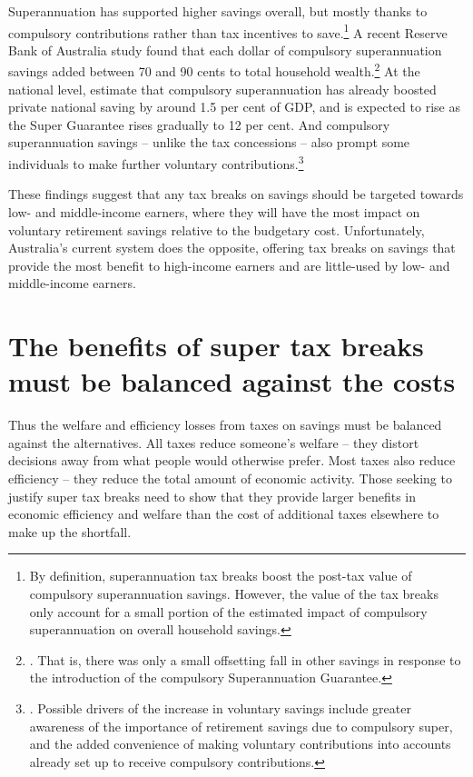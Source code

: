 Superannuation has supported higher savings overall, but mostly thanks to compulsory contributions rather than tax incentives to save.\footnote{By definition, superannuation tax breaks boost the post-tax value of compulsory superannuation savings. However, the value of the tax breaks only account for a small portion of the estimated impact of compulsory superannuation on overall household savings.} 
A recent Reserve Bank of Australia study found that each dollar of compulsory superannuation savings added between 70 and 90 cents to total household wealth.\footnote{\textcite{Connolly2007}. That is, there was only a small offsetting fall in other savings in response to the introduction of the compulsory Superannuation Guarantee.} 
At the national level, \textcite{GruenSoding2011} estimate that compulsory superannuation has already boosted private national saving by around 1.5 per cent of GDP, and is expected to rise as the Super Guarantee rises gradually to 12 per cent. And compulsory superannuation savings – unlike the tax concessions – also prompt some individuals to make further voluntary contributions.\footnote{\textcite[][4]{Connolly2007}. Possible drivers of the increase in voluntary savings include greater awareness of the importance of retirement savings due to compulsory super, and the added convenience of making voluntary contributions into accounts already set up to receive compulsory contributions.}

These findings suggest that any tax breaks on savings should be targeted towards low- and middle-income earners, where they will have the most impact on voluntary retirement savings relative to the budgetary cost. Unfortunately, Australia’s current system does the opposite, offering tax breaks on savings that provide the most benefit to high-income earners and are little-used by low- and middle-income earners. 

\section{The benefits of super tax breaks must be balanced against the costs}\label{sec:SUPER-2-7}
Thus the welfare and efficiency losses from taxes on savings must be balanced against the alternatives. All taxes reduce someone’s welfare – they distort decisions away from what people would otherwise prefer. Most taxes also reduce efficiency – they reduce the total amount of economic activity. Those seeking to justify super tax breaks need to show that they provide larger benefits in economic efficiency and welfare than the cost of additional taxes elsewhere to make up the shortfall.

